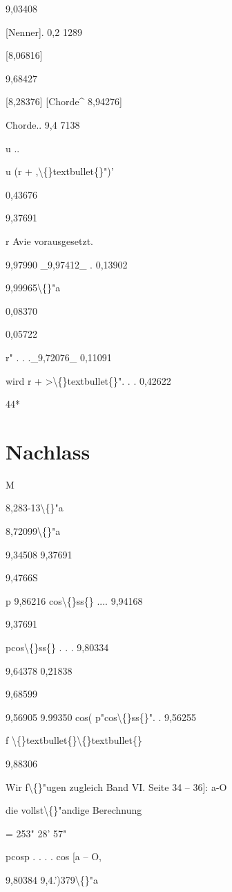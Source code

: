 \documentclass[10pt,a4paper]{article}
\begin{document}
9,03408

[Nenner]. 0,2 1289

[8,06816]

9,68427

[8,28376]
[Chorde\textasciicircum{} 8,94276]

Chorde.. 9,4 7138

u ..

u (r + ,\textbackslash\{\}textbullet\{\}")'

0,43676

9,37691

r
Avie vorausgesetzt.

9,97990
\_9,97412\_
. 0,13902

9,99965\textbackslash\{\}"a

0,08370

0,05722

r" . . .\_9,72076\_
0,11091

wird r + >\textbackslash\{\}textbullet\{\}". . . 0,42622

44*

\newpage

\section*{Nachlass}

M

8,283-13\textbackslash\{\}"a

8,72099\textbackslash\{\}"a

9,34508
9,37691

9,4766S

p
9,86216
cos\textbackslash\{\}ss\{\} .... 9,94168

9,37691

pcos\textbackslash\{\}ss\{\} . . . 9,80334

9,64378
0,21838

9,68599

9,56905
9.99350
cos(
p"cos\textbackslash\{\}ss\{\}". . 9,56255

f \textbackslash\{\}textbullet\{\}\textbackslash\{\}textbullet\{\}

9,88306

Wir f\textbackslash\{\}"ugen
zugleich
Band VI. Seite 34 -- 36]:
a-O

die vollst\textbackslash\{\}"andige Berechnung

= 253" 28' 57"

pcosp . . . .
cos [a -- O,

9,80384
9,4.')379\textbackslash\{\}"a
\end{document}
